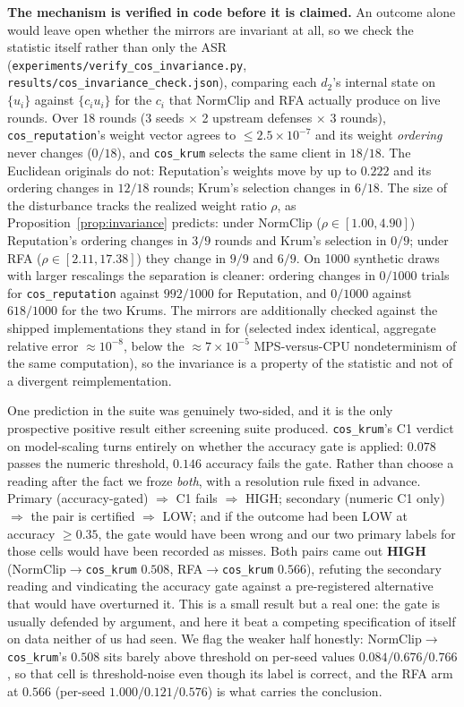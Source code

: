 \documentclass{article}
\begin{document}
\textbf{The mechanism is verified in code before it is claimed.} An outcome alone would leave open whether the mirrors are invariant at all, so we check the statistic itself rather than only the ASR (\texttt{experiments/verify\_cos\_invariance.py}, \texttt{results/cos\_invariance\_check.json}), comparing each $d_2$'s internal state on $\{u_i\}$ against $\{c_iu_i\}$ for the $c_i$ that NormClip and RFA actually produce on live rounds. Over 18 rounds (3 seeds $\times$ 2 upstream defenses $\times$ 3 rounds), \texttt{cos\_reputation}'s weight vector agrees to $\le 2.5\times10^{-7}$ and its weight \emph{ordering} never changes ($0/18$), and \texttt{cos\_krum} selects the same client in $18/18$. The Euclidean originals do not: Reputation's weights move by up to $0.222$ and its ordering changes in $12/18$ rounds; Krum's selection changes in $6/18$. The size of the disturbance tracks the realized weight ratio $\rho$, as Proposition~\ref{prop:invariance} predicts: under NormClip ($\rho \in [1.00,4.90]$) Reputation's ordering changes in $3/9$ rounds and Krum's selection in $0/9$; under RFA ($\rho \in [2.11,17.38]$) they change in $9/9$ and $6/9$. On 1000 synthetic draws with larger rescalings the separation is cleaner: ordering changes in $0/1000$ trials for \texttt{cos\_reputation} against $992/1000$ for Reputation, and $0/1000$ against $618/1000$ for the two Krums. The mirrors are additionally checked against the shipped implementations they stand in for (selected index identical, aggregate relative error ${\approx}10^{-8}$, below the ${\approx}7\times10^{-5}$ MPS-versus-CPU nondeterminism of the same computation), so the invariance is a property of the statistic and not of a divergent reimplementation.

One prediction in the suite was genuinely two-sided, and it is the only prospective positive result either screening suite produced. \texttt{cos\_krum}'s C1 verdict on model-scaling turns entirely on whether the accuracy gate is applied: $0.078$ passes the numeric threshold, $0.146$ accuracy fails the gate. Rather than choose a reading after the fact we froze \emph{both}, with a resolution rule fixed in advance. Primary (accuracy-gated) $\Rightarrow$ C1 fails $\Rightarrow$ HIGH; secondary (numeric C1 only) $\Rightarrow$ the pair is certified $\Rightarrow$ LOW; and if the outcome had been LOW at accuracy $\ge 0.35$, the gate would have been wrong and our two primary labels for those cells would have been recorded as misses. Both pairs came out \textbf{HIGH} (NormClip$\to$\texttt{cos\_krum} $0.508$, RFA$\to$\texttt{cos\_krum} $0.566$), refuting the secondary reading and vindicating the accuracy gate against a pre-registered alternative that would have overturned it. This is a small result but a real one: the gate is usually defended by argument, and here it beat a competing specification of itself on data neither of us had seen. We flag the weaker half honestly: NormClip$\to$\texttt{cos\_krum}'s $0.508$ sits barely above threshold on per-seed values $0.084 / 0.676 / 0.766$, so that cell is threshold-noise even though its label is correct, and the RFA arm at $0.566$ (per-seed $1.000 / 0.121 / 0.576$) is what carries the conclusion.
\end{document}
